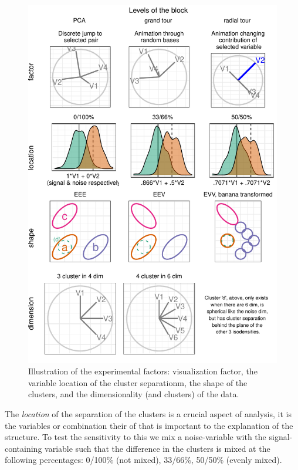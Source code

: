 \documentclass{monashthesis}
\begin{document}
\begin{figure}

{\centering \includegraphics[width=1\linewidth,]{./figures_from_script/ch4_fig2_exp_factors} 

}

\caption{Illustration of the experimental factors: visualization factor, the variable location of the cluster separationm, the shape of the clusters, and the dimensionality (and clusters) of the data.}\label{fig:ch4fig2}
\end{figure}

The \emph{location} of the separation of the clusters is a crucial aspect of analysis, it is the variables or combination their of that is important to the explanation of the structure. To test the sensitivity to this we mix a noise-variable with the signal-containing variable such that the difference in the clusters is mixed at the following percentages: 0/100\% (not mixed), 33/66\%, 50/50\% (evenly mixed).
\end{document}
